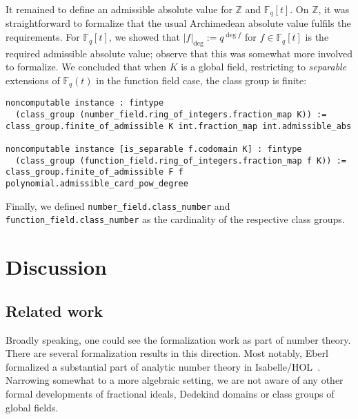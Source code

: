 \documentclass[a4paper,USenglish,cleveref, autoref, thm-restate]{lipics-v2021}
\newcommand{\lean}[1]{\texttt{#1}\xspace} %
\newcommand*{\Fq}[1][q]{\mathbb{F}_{#1}}
\newcommand{\Z}{\mathbb{Z}}
\begin{document}
It remained to define an admissible absolute value for $\Z$ and $\Fq[q][t]$. On $\Z$, it was straightforward to formalize that the usual Archimedean absolute value fulfils the requirements. For $\Fq[q][t]$, we showed that $\lvert f\rvert_{\deg}:=q^{\deg f}$ for $f \in \Fq[q][t]$ is the required admissible absolute value; observe that this was somewhat more involved to formalize.
We concluded that when $K$ is a global field, restricting to \emph{separable} extensions of $\Fq[q](t)$ in the function field case, the class group is finite:
\begin{lstlisting}
noncomputable instance : fintype
  (class_group (number_field.ring_of_integers.fraction_map K)) :=
class_group.finite_of_admissible K int.fraction_map int.admissible_abs

noncomputable instance [is_separable f.codomain K] : fintype
  (class_group (function_field.ring_of_integers.fraction_map f K)) :=
class_group.finite_of_admissible F f polynomial.admissible_card_pow_degree
\end{lstlisting}

Finally, we defined \lean{number\_field.class\_number} and \lean{function\_field.class\_number} as the cardinality of the respective class groups.

\section{Discussion}

\subsection{Related work}

Broadly speaking, one could see the formalization work as part of number theory. There are several formalization results in this direction. %
Most notably, Eberl formalized a substantial part of analytic number theory in Isabelle/HOL~\cite{Eberl19}.
Narrowing somewhat to a more algebraic setting, we are not aware of any other formal developments of fractional ideals, Dedekind domains or class groups of global fields.
\end{document}
